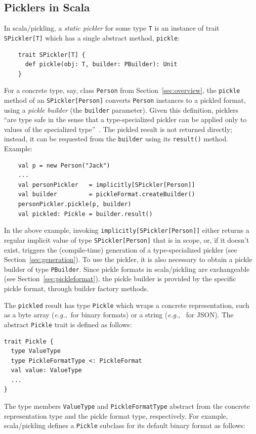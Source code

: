 \documentclass[10pt]{sigplanconf}
\theoremstyle{definition}
\theoremstyle{definition}
\newcommand{\eg}{{\em e.g.,~}}
\begin{document}
\subsection{Picklers in Scala}\label{sub:picklers-scala}

In scala/pickling, a {\em static pickler} for some type \verb|T| is an
instance of trait \verb|SPickler[T]| which has a single abstract method,
\verb|pickle|:

\begin{lstlisting}
    trait SPickler[T] {
      def pickle(obj: T, builder: PBuilder): Unit
    }
\end{lstlisting}
\noindent
For a concrete type, say, class \verb|Person| from Section~\ref{sec:overview},
the \verb|pickle| method of an \verb|SPickler[Person]| converts
\verb|Person| instances to a pickled format, using a {\em pickle builder} (the
\verb|builder| parameter). Given this definition, picklers ``are type safe in
the sense that a type-specialized pickler can be applied only to values of the
specialized type''~\cite{Elsman2005}. The pickled result is not returned
directly; instead, it can be requested from the \verb|builder| using its
\verb|result()| method. Example:

\begin{lstlisting}
    val p = new Person("Jack")
    ...
    val personPickler   = implicitly[SPickler[Person]]
    val builder         = pickleFormat.createBuilder()
    personPickler.pickle(p, builder)
    val pickled: Pickle = builder.result()
\end{lstlisting}
\noindent
In the above example, invoking \verb|implicitly[SPickler[Person]]| either
returns a regular implicit value of type \verb|SPickler[Person]| that is in
scope, or, if it doesn't exist, triggers the (compile-time) generation of a
type-specialized pickler (see Section~\ref{sec:generation}). To use the
pickler, it is also necessary to obtain a pickle builder of type \verb|PBuilder|. Since pickle formats
in scala/pickling are exchangeable (see Section~\ref{sec:pickleformat}), the pickle
builder is provided by the specific pickle format, through builder factory
methods.

The \verb|pickled| result has type \verb|Pickle| which wraps a concrete
representation, such as a byte array (\eg for binary formats) or a string (\eg
for JSON). The abstract \verb|Pickle| trait is defined as follows:

\begin{lstlisting}
trait Pickle {
  type ValueType
  type PickleFormatType <: PickleFormat
  val value: ValueType
  ...
}
\end{lstlisting}
\noindent
The type members \verb|ValueType| and \verb|PickleFormatType| abstract from
the concrete representation type and the pickle format type, respectively.
For example, scala/pickling defines a \verb|Pickle| subclass for its default binary format
as follows:
\end{document}
